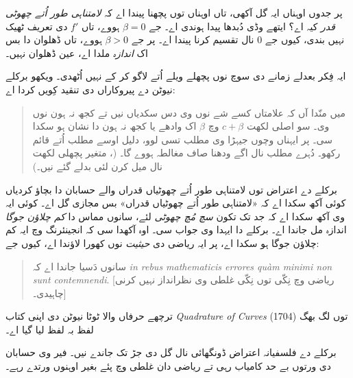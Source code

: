 \documentclass[../../../include/open-logic-section]{subfiles}
\begin{document}
پر جدوں اوہناں ایہ گل آکھی، تاں اوہناں توں پچھنا پیندا اے کہ \emph{لامتناہی طور اُتے چھوٹی قدر} کیہ اے؟ ایتھے وڈی دُبدھا پیدا ہوندی اے۔ جے $\beta = 0$ ہووے، تاں $f'$ دی تعریف ٹھیک نہیں بندی، کیوں جے $0$ نال تقسیم کرنا پیندا اے۔ پر جے $\beta >
0$ ہووے، تاں ڈھلوان دا بس اک \emph{اندازہ} ملدا اے، عین ڈھلوان نہیں۔

ایہ فِکر بعدلے زمانے دی سوچ نوں پچھلے ویلے اُتے لاگو کر کے نہیں اُٹھدی۔ ویکھو برکلے نیوٹن دے پیروکاراں دی تنقید کِویں کردا اے:
\begin{quote}
میں منّدا آں کہ علامتاں کسے شے نوں وی دس سکدیاں نیں تے کجھ نہ ہون نوں وی۔ سو اصلی لکھت $c + \beta$ وچ $\beta$ اک وادھے یا کجھ نہ ہون دا نشان ہو سکدا سی۔ پر ایہناں وچوں جیہڑا وی مطلب تسی لوو، دلیل اوسے مطلب اُتے قائم رکھو۔ دُہرے مطلب نال اگے ودھنا صاف مغالطہ ہووے گا۔ (\citealt[\S{}XIII]{Berkeley1734}، متغیر پچھلی لکھت نال میل کرن لئی بدلے گئے نیں۔)
\end{quote}
برکلے دے اعتراض توں لامتناہی طور اُتے چھوٹیاں قدراں والے حسابان دا بچاؤ کردیاں کوئی آکھ سکدا اے کہ «لامتناہی طور اُتے چھوٹیاں قدراں» بس مجازی گل اے۔ کوئی ایہ وی آکھ سکدا اے کہ جد تک تکون \emph{سچ مُچ چھوٹی} لئے، سانوں مماس دا \emph{کم چلاؤن جوگا} اندازہ مل جاندا اے۔ برکلے دا ایہدا وی جواب سی۔ اوہ آکھدا سی کہ انجینئرنگ وچ ایہ کم چلاؤن جوگا ہو سکدا اے، پر ایہ ریاضی دی \emph{حیثیت} نوں کھورا لاؤندا اے، کیوں جے:
\begin{quote}
سانوں دَسیا جاندا اے کہ \emph{in rebus mathematicis errores qu\`{a}m minimi
non sunt contemnendi}. [ریاضی وچ نِکّی توں نِکّی غلطی وی نظرانداز نہیں کرنی چاہیدی۔] \citep[\S{}IX]{Berkeley1734}
\end{quote}
ترچھے حرفاں والا ٹوٹا نیوٹن دی اپنی کتاب \emph{Quadrature of Curves} (1704) توں لگ بھگ لفظ بہ لفظ لیا گیا اے۔

برکلے دے فلسفیانہ اعتراض ڈونگھائی نال گل دی جڑ تک جاندے نیں۔ فیر وی حسابان دی ورتوں بے حد کامیاب رہی تے ریاضی دان غلطی وچ پئے بغیر اوہنوں ورتدے رہے۔
\end{document}
